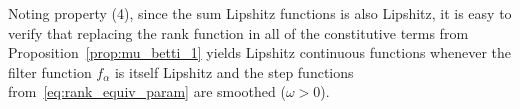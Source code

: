 \documentclass[10pt]{article}
\numberwithin{equation}{section}
\newcommand{\+}{%
	\raisebox{0.18ex}{\scaleobj{0.55}{+}}
}
\theoremstyle{definition}
\newtheorem{definition}{Definition}
\theoremstyle{definition}
\newcommand\numberthis{\addtocounter{equation}{1}\tag{\theequation}}
\begin{document}
\noindent Noting property (4), since the sum Lipshitz functions is also Lipshitz, it is easy to verify that 
replacing the rank function in all of the constitutive terms from Proposition~\ref{prop:mu_betti_1} yields Lipshitz continuous functions whenever the filter function $f_\alpha$ is itself Lipshitz and the step functions from~\eqref{eq:rank_equiv_param} are smoothed ($\omega > 0$). 
\end{document}
